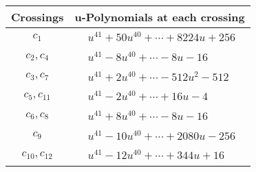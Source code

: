 \documentclass[1p]{elsarticle_modified}
\theoremstyle{definition}
\begin{document}
\begin{tabular}{m{50pt}|m{274pt}}
Crossings & \hspace{64pt}u-Polynomials at each crossing \\
\hline $$\begin{aligned}c_{1}\end{aligned}$$&$\begin{aligned}
&u^{41}+50 u^{40}+\cdots+8224 u+256
\end{aligned}$\\
\hline $$\begin{aligned}c_{2},c_{4}\end{aligned}$$&$\begin{aligned}
&u^{41}-8 u^{40}+\cdots-8 u-16
\end{aligned}$\\
\hline $$\begin{aligned}c_{3},c_{7}\end{aligned}$$&$\begin{aligned}
&u^{41}+2 u^{40}+\cdots-512 u^2-512
\end{aligned}$\\
\hline $$\begin{aligned}c_{5},c_{11}\end{aligned}$$&$\begin{aligned}
&u^{41}-2 u^{40}+\cdots+16 u-4
\end{aligned}$\\
\hline $$\begin{aligned}c_{6},c_{8}\end{aligned}$$&$\begin{aligned}
&u^{41}+8 u^{40}+\cdots-8 u-16
\end{aligned}$\\
\hline $$\begin{aligned}c_{9}\end{aligned}$$&$\begin{aligned}
&u^{41}-10 u^{40}+\cdots+2080 u-256
\end{aligned}$\\
\hline $$\begin{aligned}c_{10},c_{12}\end{aligned}$$&$\begin{aligned}
&u^{41}-12 u^{40}+\cdots+344 u+16
\end{aligned}$\\
\hline
\end{tabular}\\~\\
\newpage\renewcommand{\arraystretch}{1}
\end{document}

